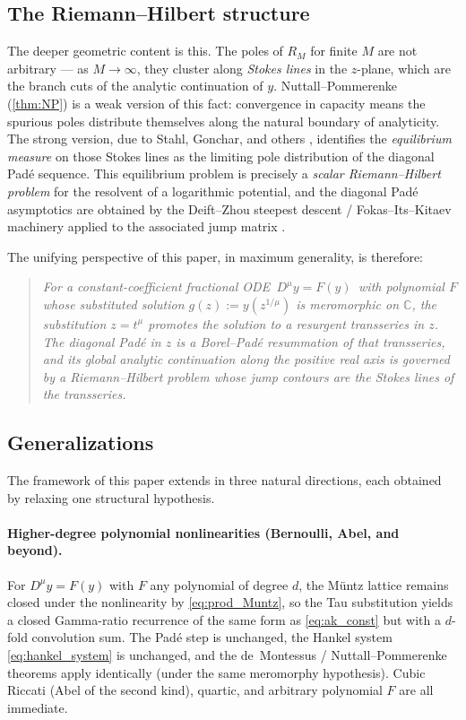 \documentclass[11pt,a4paper]{article}
\newcommand{\C}{\mathbb{C}}
\begin{document}
\subsection{The Riemann--Hilbert structure}

The deeper geometric content is this. The poles of \(R_M\) for finite \(M\) are not arbitrary --- as \(M\to\infty\), they cluster along \emph{Stokes lines} in the \(z\)-plane, which are the branch cuts of the analytic continuation of \(y\).
Nuttall--Pommerenke (\cref{thm:NP}) is a weak version of this fact: convergence in capacity means the spurious poles distribute themselves along the natural boundary of analyticity.
The strong version, due to Stahl, Gonchar, and others \cite{stahl1997}, identifies the \emph{equilibrium measure} on those Stokes lines as the limiting pole distribution of the diagonal Pad\'e sequence.
This equilibrium problem is precisely a \emph{scalar Riemann--Hilbert problem} for the resolvent of a logarithmic potential, and the diagonal Pad\'e asymptotics are obtained by the Deift--Zhou steepest descent / Fokas--Its--Kitaev machinery applied to the associated jump matrix \cite{deift1999}.

The unifying perspective of this paper, in maximum generality, is therefore:

\begin{quote}
\emph{For a constant-coefficient fractional ODE \(\,D^\mu y=F(y)\,\) with polynomial \(F\) whose substituted solution \(g(z):=y(z^{1/\mu})\) is meromorphic on \(\C\), the substitution \(z=t^\mu\) promotes the solution to a resurgent transseries in \(z\). The diagonal Pad\'e in \(z\) is a Borel--Pad\'e resummation of that transseries, and its global analytic continuation along the positive real axis is governed by a Riemann--Hilbert problem whose jump contours are the Stokes lines of the transseries.}
\end{quote}

\subsection{Generalizations}

The framework of this paper extends in three natural directions, each obtained by relaxing one structural hypothesis.

\paragraph{Higher-degree polynomial nonlinearities (Bernoulli, Abel, and beyond).}
For \(D^\mu y=F(y)\) with \(F\) any polynomial of degree \(d\), the M\"untz lattice remains closed under the nonlinearity by \eqref{eq:prod_Muntz}, so the Tau substitution yields a closed Gamma-ratio recurrence of the same form as \eqref{eq:ak_const} but with a \(d\)-fold convolution sum.
The Pad\'e step is unchanged, the Hankel system \eqref{eq:hankel_system} is unchanged, and the de~Montessus / Nuttall--Pommerenke theorems apply identically (under the same meromorphy hypothesis).
Cubic Riccati (Abel of the second kind), quartic, and arbitrary polynomial \(F\) are all immediate.
\end{document}
